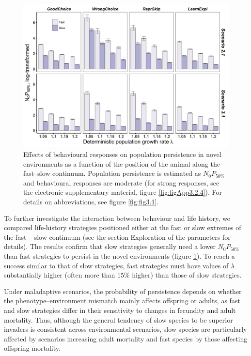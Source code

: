 \begin{figure}
\centering
\includegraphics[width=\textwidth]{./Figures/chapter03/Fig_3.jpg}
\caption[Effects on $N_{0}P_{50\%}$]{
Effects of behavioural responses on population persistence in novel environments as a function of the position of the animal along the fast–slow
continuum. Population persistence is estimated as $N_{0}P_{50\%}$ and behavioural responses are moderate (for strong responses, see the electronic supplementary material,
figure \ref{fig:figApp3.2.4}). For details on abbreviations, see figure \ref{fig:fig3.1}.}
\label{fig:fig3.3}
\end{figure}

To further investigate the interaction between behaviour and
life history, we compared life-history strategies positioned
either at the fast or slow extremes of the fast – slow continuum
(see the section Exploration of the parameters for details). The
results confirm that slow strategies generally need a lower
$N_{0}P_{50\%}$ than fast strategies to persist in the novel environments
(figure \ref{fig:fig3.3}). To reach a success similar to that of slow strategies,
fast strategies must have values of $\lambda$ substantially higher (often
more than 15\% higher) than those of slow strategies.

Under maladaptive scenarios, the probability of persistence
depends on whether the phenotype–environment mismatch
mainly affects offspring or adults, as fast and slow strategies
differ in their sensitivity to changes in fecundity and adult mortality.
Thus, although the general tendency of slow species to
be superior invaders is consistent across environmental scenarios,
slow species are particularly affected by scenarios
increasing adult mortality and fast species by those affecting
offspring mortality.

